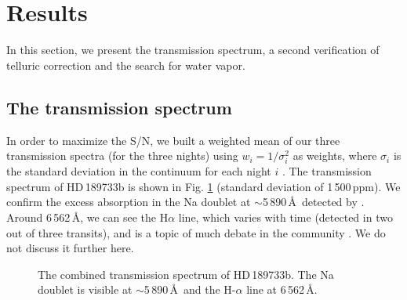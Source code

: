 \documentclass{aa}
\begin{document}

\section{Results}
\label{result}
In this section, we present the transmission spectrum, a second verification of telluric correction and the search for water vapor.

	\subsection{The transmission spectrum}
In order to maximize the S/N, we built a weighted mean of our three transmission spectra (for the three nights) using $w_i=1/\sigma_{i}^{2}$ as weights, where $\sigma_{i}$ is the standard deviation in the continuum for each night $i$ . The transmission spectrum of HD\,189733b is shown in Fig. \ref{transmission spectrum} (standard deviation of 1\,500\,ppm). We confirm the excess absorption in the Na doublet at $\sim$5\,890\,\AA\ detected by \cite{wyttenbach_spectrally_2015}. Around 6\,562\,\AA , we can see the H$\alpha$ line, which varies with time (detected in two out of  three transits), and is a topic of much debate in the community \citep{barnes_origin_2016,cauley_optical_2015,cauley_variation_2016,cauley_evidence_2017}. We do not discuss it further here. 
\begin{figure}[t]
\caption[transmission spectrum]{The combined transmission spectrum of HD\,189733b. The Na doublet is visible at $\sim$5\,890\,\AA\ and the H-$\alpha$ line at 6\,562\,\AA. }
\label{transmission spectrum}
\end{figure}
\end{document}

